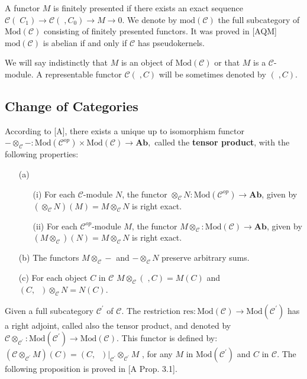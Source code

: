 \documentclass{amsart}
\theoremstyle{plain}
\numberwithin{equation}{section}
\begin{document}
A functor $M$ is finitely presented if there exists an exact sequence $\mathcal{C}(\;C_{1})\rightarrow \mathcal{C}(\;,C_{0})\rightarrow
M\rightarrow 0$. We denote by $\mathrm{mod}(\mathcal{C})$ the full
subcategory of $\mathrm{Mod}(\mathcal{C})$ consisting of finitely presented
functors. It was proved in [AQM] $\mathrm{mod}(\mathcal{C})$ is abelian if
and only if $\mathcal{C}$ has pseudokernels.

We will say indistinctly that $M$ is an object of $\mathrm{Mod}(\mathcal{C})$
or that $M$ is a $\mathcal{C}$-module. A representable functor $\mathcal{C}(\;,C)$ will be sometimes denoted by $(\;,C).$

\subsection{Change of Categories}

According to [A], there exists a unique up to isomorphism functor $-\otimes
_{\mathcal{C}}-:\mathrm{Mod}(\mathcal{C}^{op})\times \mathrm{Mod}(\mathcal{C})\rightarrow \mathbf{Ab,}$ called the \textbf{tensor product}, with the
following properties:

\begin{itemize}
\item[(a)]

\begin{itemize}
\item[(i)] For each $\mathcal{C}$-module $N$, the functor $\otimes _{\mathcal{C}}N:\mathrm{Mod}(\mathcal{C}^{op})\rightarrow \mathbf{Ab}$, given
by $(\otimes _{\mathcal{C}}N)(M)=M\otimes _{\mathcal{C}}N$ is right exact.

\item[(ii)] For each $\mathcal{C}^{op}$-module $M$, the functor $M\otimes _{\mathcal{C}}:\mathrm{Mod}(\mathcal{C})\rightarrow \mathbf{Ab}$, given by $(M\otimes _{\mathcal{C}})(N)=M\otimes _{\mathcal{C}}N$ is right exact.
\end{itemize}

\item[(b)] The functors $M\otimes _{\mathcal{C}}-$ and $-\otimes _{\mathcal{C}}N$ preserve arbitrary sums.

\item[(c)] For each object $C$ in $\mathcal{C}$ $M\otimes _{\mathcal{C}}(\;,C)=M(C)$ and $(C,\;\;)\otimes _{\mathcal{C}}N=N(C)$.
\end{itemize}

Given a full subcategory $\mathcal{C}^{\prime }$ of $\mathcal{C}$. The
restriction $\mathrm{res}:\mathrm{Mod}(\mathcal{C})\rightarrow \mathrm{Mod}(\mathcal{C}^{\prime })$ has a right adjoint, called also the tensor product,
and denoted by $\mathcal{C}\otimes _{\mathcal{C}^{\prime }}:\mathrm{Mod}(\mathcal{C}^{\prime })\rightarrow \mathrm{Mod}(\mathcal{C}).$ This functor
is defined by: $(\mathcal{C}\otimes _{\mathcal{C}^{\prime }}M)(C)=(C,\;\;)|_{\mathcal{C}^{\prime }}\otimes _{\mathcal{C}^{\prime }}M$ , for any $M$ in $\mathrm{Mod}(\mathcal{C}^{\prime })$ and $C$ in $\mathcal{C}$. The following
proposition is proved in [A Prop. 3.1].
\end{document}
